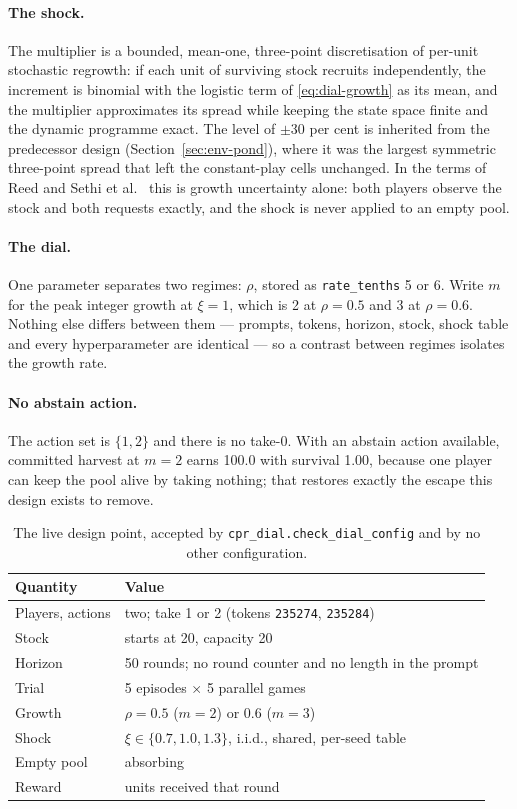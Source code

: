 \paragraph{The shock.}
The multiplier is a bounded, mean-one, three-point discretisation of
per-unit stochastic regrowth: if each unit of surviving stock recruits
independently, the increment is binomial with the logistic term of
\eqref{eq:dial-growth} as its mean, and the multiplier approximates its
spread while keeping the state space finite and the dynamic programme exact.
The level of \(\pm 30\) per cent is inherited from the predecessor design
(Section~\ref{sec:env-pond}), where it was the largest symmetric
three-point spread that left the constant-play cells unchanged.
In the terms of Reed \cite{reed1979} and Sethi et al.\ \cite{sethi2005}
this is growth uncertainty alone: both players observe the stock and both
requests exactly, and the shock is never applied to an empty pool.

\paragraph{The dial.}
One parameter separates two regimes: \(\rho\), stored as
\texttt{rate\_tenths} 5 or 6.
Write \(m\) for the peak integer growth at \(\xi=1\), which is 2 at
\(\rho=0.5\) and 3 at \(\rho=0.6\).
Nothing else differs between them --- prompts, tokens, horizon, stock,
shock table and every hyperparameter are identical --- so a contrast between
regimes isolates the growth rate.

\paragraph{No abstain action.}
The action set is \(\{1,2\}\) and there is no take-0.
With an abstain action available, committed harvest at \(m=2\) earns 100.0
with survival 1.00, because one player can keep the pool alive by taking
nothing; that restores exactly the escape this design exists to remove.

\begin{table}[ht]
\centering\small
\caption{The live design point, accepted by \texttt{cpr\_dial.check\_dial\_config}
  and by no other configuration.}
\label{tab:dial-lock}
\begin{tabular}{ll}
\toprule
Quantity & Value \\
\midrule
Players, actions & two; take 1 or 2 (tokens \texttt{235274}, \texttt{235284}) \\
Stock & starts at 20, capacity 20 \\
Horizon & 50 rounds; no round counter and no length in the prompt \\
Trial & 5 episodes \(\times\) 5 parallel games \\
Growth & \(\rho=0.5\) (\(m=2\)) or \(0.6\) (\(m=3\)) \\
Shock & \(\xi\in\{0.7,1.0,1.3\}\), i.i.d., shared, per-seed table \\
Empty pool & absorbing \\
Reward & units received that round \\
\bottomrule
\end{tabular}
\end{table}

